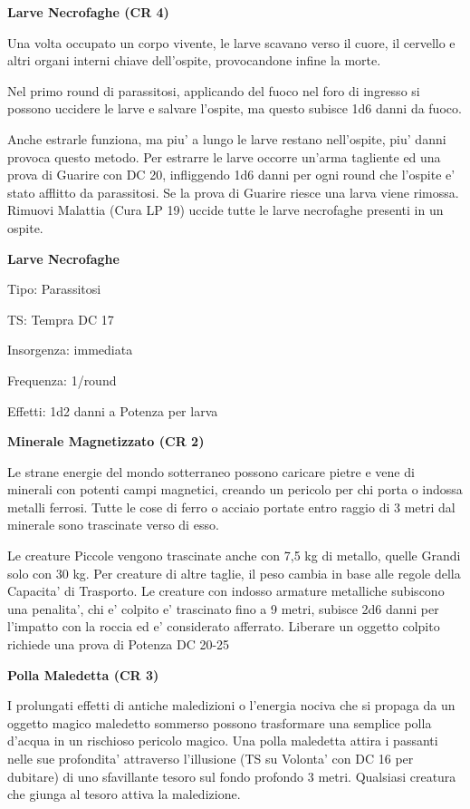 \documentclass[a4paper,11pt,twoside,openany]{book}
\begin{document}
\textbf{Larve Necrofaghe (CR 4)}

Una volta occupato un corpo vivente, le larve scavano verso il cuore, il cervello e altri organi interni chiave dell'ospite, provocandone infine la morte.

Nel primo round di parassitosi, applicando del fuoco nel foro di ingresso si possono uccidere le larve e salvare l'ospite, ma questo subisce 1d6 danni da fuoco. 

Anche estrarle funziona, ma piu' a lungo le larve restano nell'ospite, piu' danni provoca questo metodo. Per estrarre le larve occorre un'arma tagliente ed una prova di Guarire con DC 20, infliggendo 1d6 danni per ogni round che l'ospite e' stato afflitto da parassitosi. Se la prova di Guarire riesce una larva viene rimossa. Rimuovi Malattia (Cura LP 19) uccide tutte le larve necrofaghe presenti in un ospite.

\textbf{Larve Necrofaghe}

Tipo: Parassitosi

TS: Tempra DC 17

Insorgenza: immediata

Frequenza: 1/round

Effetti: 1d2 danni a Potenza per larva

\textbf{Minerale Magnetizzato (CR 2)}

Le strane energie del mondo sotterraneo possono caricare pietre e vene di minerali con potenti campi magnetici, creando un pericolo per chi porta o indossa metalli ferrosi. Tutte le cose di ferro o acciaio portate entro raggio di 3 metri dal minerale sono trascinate verso di esso.

Le creature Piccole vengono trascinate anche con 7,5 kg di metallo, quelle Grandi solo con 30 kg. Per creature di altre taglie, il peso cambia in base alle regole della Capacita' di Trasporto. Le creature con indosso armature metalliche subiscono una penalita', chi e' colpito e' trascinato fino a 9 metri, subisce 2d6 danni per l'impatto con la roccia ed e' considerato afferrato. Liberare un oggetto colpito richiede una prova di Potenza DC 20-25

\textbf{Polla Maledetta (CR 3)}

I prolungati effetti di antiche maledizioni o l'energia nociva che si propaga da un oggetto magico maledetto sommerso possono trasformare una semplice polla d'acqua in un rischioso pericolo magico. Una polla maledetta attira i passanti nelle sue profondita' attraverso l'illusione (TS su Volonta' con DC 16 per dubitare) di uno sfavillante tesoro sul fondo profondo 3 metri. Qualsiasi creatura che giunga al tesoro attiva la maledizione.
\end{document}

